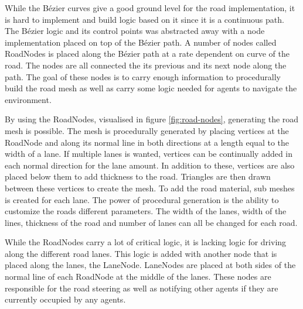     
        While the Bézier curves give a good ground level for the road implementation, it is hard to implement and build logic based on it since it is a continuous path. The Bézier logic and its control points was abstracted away with a node implementation placed on top of the Bézier path. A number of nodes called RoadNodes is placed along the Bézier path at a rate dependent on curve of the road. The nodes are all connected the its previous and its next node along the path. The goal of these nodes is to carry enough information to procedurally  build the road mesh as well as carry some logic needed for agents to navigate the environment.
        
    
        By using the RoadNodes, visualised in figure \ref{fig:road-nodes}, generating the road mesh is possible. The mesh is procedurally generated by placing vertices at the RoadNode and along its normal line in both directions at a length equal to the width of a lane. If multiple lanes is wanted, vertices can be continually added in each normal direction for the lane amount. In addition to these, vertices are also placed below them to add thickness to the road. Triangles are then drawn between these vertices to create the mesh. To add the road material, sub meshes is created for each lane. The power of procedural generation is the ability to customize the roads different parameters. The width of the lanes, width of the lines, thickness of the road and number of lanes can all be changed for each road.

        While the RoadNodes carry a lot of critical logic, it is lacking logic for driving along the different road lanes. This logic is added with another node that is placed along the lanes, the LaneNode. LaneNodes are placed at both sides of the normal line of each RoadNode at the middle of the lanes. These nodes are responsible for the road steering as well as notifying other agents if they are currently occupied by any agents.
    

